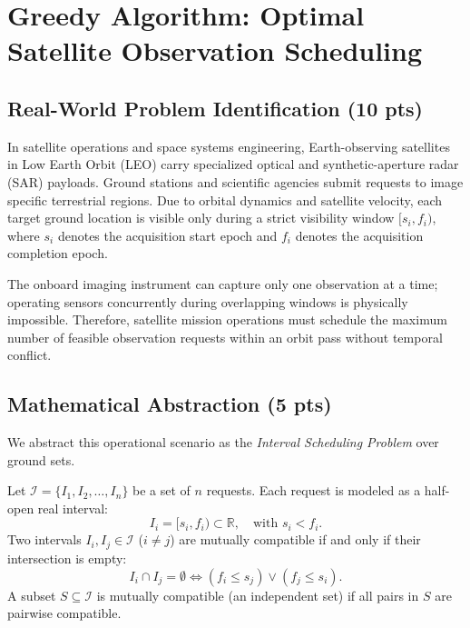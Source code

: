 \section{Greedy Algorithm: Optimal Satellite Observation Scheduling}

\subsection{Real-World Problem Identification (10 pts)}
In satellite operations and space systems engineering, Earth-observing satellites in Low Earth Orbit (LEO) carry specialized optical and synthetic-aperture radar (SAR) payloads. Ground stations and scientific agencies submit requests to image specific terrestrial regions. Due to orbital dynamics and satellite velocity, each target ground location is visible only during a strict visibility window $[s_i, f_i)$, where $s_i$ denotes the acquisition start epoch and $f_i$ denotes the acquisition completion epoch.

The onboard imaging instrument can capture only one observation at a time; operating sensors concurrently during overlapping windows is physically impossible. Therefore, satellite mission operations must schedule the maximum number of feasible observation requests within an orbit pass without temporal conflict.

\subsection{Mathematical Abstraction (5 pts)}
We abstract this operational scenario as the \textit{Interval Scheduling Problem} over ground sets.
\begin{definition}
Let $\mathcal{I} = \{I_1, I_2, \dots, I_n\}$ be a set of $n$ requests. Each request is modeled as a half-open real interval:
\begin{equation}
I_i = [s_i, f_i) \subset \mathbb{R}, \quad \text{with } s_i < f_i.
\end{equation}
Two intervals $I_i, I_j \in \mathcal{I}$ ($i \neq j$) are mutually compatible if and only if their intersection is empty:
\begin{equation}
I_i \cap I_j = \emptyset \iff (f_i \le s_j) \lor (f_j \le s_i).
\end{equation}
A subset $S \subseteq \mathcal{I}$ is mutually compatible (an independent set) if all pairs in $S$ are pairwise compatible.
\end{definition}


